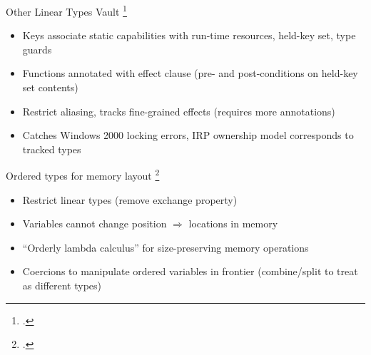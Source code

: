 \documentclass[aspectratio=169]{beamer}
\begin{document}
\begin{frame}{Other Linear Types}
\footnotesize
  Vault \footcite{deline_enforcing_2001} %
    \vspace{-0.09in}
    \begin{itemize}
        \item Keys associate static capabilities with run-time resources, held-key set, type guards
        \item Functions annotated with effect clause (pre- and post-conditions on held-key set contents)
        \item Restrict aliasing, tracks fine-grained effects (requires more annotations)
        \item Catches Windows 2000 locking errors, IRP ownership model corresponds to tracked types
    \end{itemize}
  Ordered types for memory layout \footcite{petersen_type_2003}
    \vspace{-0.09in}
    \begin{itemize}
        \item Restrict linear types (remove exchange property)
        \item Variables cannot change position $\Rightarrow$ locations in memory
        \item ``Orderly lambda calculus'' for size-preserving memory operations
        \item Coercions to manipulate ordered variables in frontier (combine/split to treat as different types)
    \end{itemize}
  \vspace{0.1in}
\end{frame}
\end{document}
